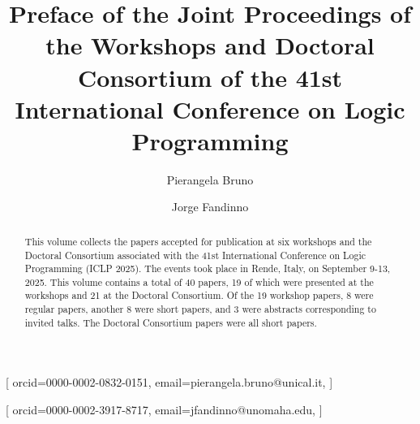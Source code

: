 \documentclass[
]{ceurart}
\begin{document}


\title{Preface of the Joint Proceedings of the Workshops and Doctoral Consortium of the 41st International Conference on Logic Programming}


\author[1]{Pierangela Bruno}[%
orcid=0000-0002-0832-0151,
email=pierangela.bruno@unical.it,
]
\address[2]{University of Calabria, Italy}


\author[2]{Jorge Fandinno}[%
orcid=0000-0002-3917-8717,
email=jfandinno@unomaha.edu,
]
\address[2]{University of Nebraska Omaha, USA}

\def\changemargin#1#2{\list{}{\rightmargin#2\leftmargin#1}\item[]}
\let\endchangemargin=\endlist 

\newcommand{\workshopp}[2]{\section{#1}\vspace{-8pt}\begin{changemargin}{19pt}{8pt} 
\rm\normalsize\it #2\end{changemargin}}
\newcommand{\workshop}[3]{\workshopp{#2}{#1 #2 (#3)}}


\begin{abstract}
This volume collects the papers accepted for publication at six workshops and the Doctoral Consortium associated with the 41st International Conference on Logic Programming (ICLP 2025).
%
The events took place in Rende, Italy, on September 9-13, 2025.
%
This volume contains a total of 40 papers, 19 of which were presented at the workshops and 21 at the Doctoral Consortium.
%
Of the 19 workshop papers, 8 were regular papers, another 8 were short papers, and 3 were abstracts corresponding to invited talks.
%
The Doctoral Consortium papers were all short papers.
\end{abstract}
\end{document}
